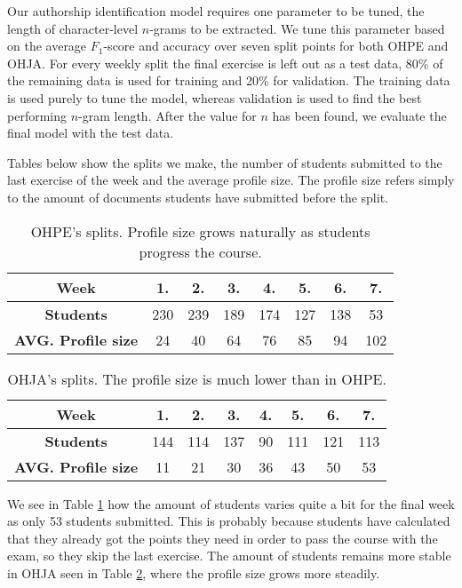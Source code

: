 Our authorship identification model requires one parameter to be tuned, the length
of character-level $n$-grams to be extracted. We tune this parameter based on the average $F_1$-score and accuracy over seven split points for both OHPE and OHJA. For every weekly split the final exercise is left out as a test data, 80\% of the remaining data is used for training and 20\% for validation. The training data is used purely to tune the model, whereas validation is used to find the best performing $n$-gram length. After the value for $n$ has been found, we evaluate the final model with the test data. 

Tables below show the splits we make, the number of students submitted to the last exercise of the week and the average profile size. The profile size refers simply to the amount of documents students have submitted before the split.


\begin{table}[ht]
\centering
\caption{OHPE's splits. Profile size grows naturally as students progress the course.}
\label{lbl-result-ai-ohpe-stat}
\begin{tabular}{|c||c|c|c|c|c|c|c|}
\hline
\bf Week             & 1.   & 2.   & 3.   & 4.   & 5.   & 6.   & 7.   \\ \hline
\bf Students         & 230 & 239 & 189 & 174 & 127 & 138 & 53  \\ \hline
\bf AVG. Profile size & 24  & 40  & 64  & 76  & 85  & 94  & 102 \\ \hline
\end{tabular}
\end{table}

\begin{table}[ht]
\centering
\caption{OHJA's splits. The profile size is much lower than in OHPE.}
\label{lbl-result-ai-ohja-stat}
\begin{tabular}{|c||c|c|c|c|c|c|c|}
\hline
\bf Week             & 1.   & 2.   & 3.   & 4.  & 5.   & 6.   & 7.   \\ \hline
\bf Students         & 144 & 114 & 137 & 90 & 111 & 121 & 113 \\ \hline
\bf AVG. Profile size & 11  & 21  & 30  & 36 & 43  & 50  & 53  \\ \hline
\end{tabular}
\end{table}

\noindent
We see in Table \ref{lbl-result-ai-ohpe-stat} how the amount of students varies quite a bit for the final week as only 53 students submitted. This is probably because students have calculated that they already got the points they need in order to pass the course with the exam, so they skip the last exercise. The amount of students remains more stable in OHJA seen in Table \ref{lbl-result-ai-ohja-stat}, where the profile size grows more steadily. 

